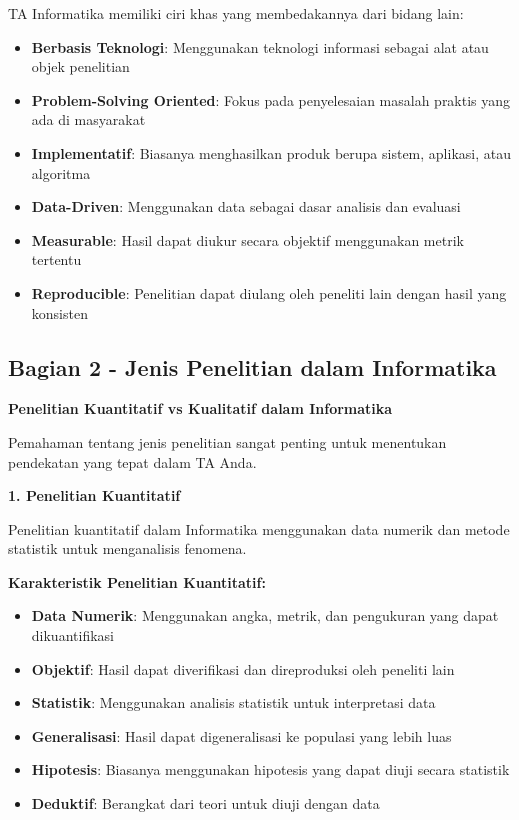 TA Informatika memiliki ciri khas yang membedakannya dari bidang lain:
\begin{itemize}
    \item \textbf{Berbasis Teknologi}: Menggunakan teknologi informasi sebagai alat atau objek penelitian
    \item \textbf{Problem-Solving Oriented}: Fokus pada penyelesaian masalah praktis yang ada di masyarakat
    \item \textbf{Implementatif}: Biasanya menghasilkan produk berupa sistem, aplikasi, atau algoritma
    \item \textbf{Data-Driven}: Menggunakan data sebagai dasar analisis dan evaluasi
    \item \textbf{Measurable}: Hasil dapat diukur secara objektif menggunakan metrik tertentu
    \item \textbf{Reproducible}: Penelitian dapat diulang oleh peneliti lain dengan hasil yang konsisten
\end{itemize}

\subsection*{Bagian 2 - Jenis Penelitian dalam Informatika}

\textbf{Penelitian Kuantitatif vs Kualitatif dalam Informatika}

Pemahaman tentang jenis penelitian sangat penting untuk menentukan pendekatan yang tepat dalam TA Anda.

\textbf{1. Penelitian Kuantitatif}

Penelitian kuantitatif dalam Informatika menggunakan data numerik dan metode statistik untuk menganalisis fenomena.

\textbf{Karakteristik Penelitian Kuantitatif:}
\begin{itemize}
    \item \textbf{Data Numerik}: Menggunakan angka, metrik, dan pengukuran yang dapat dikuantifikasi
    \item \textbf{Objektif}: Hasil dapat diverifikasi dan direproduksi oleh peneliti lain
    \item \textbf{Statistik}: Menggunakan analisis statistik untuk interpretasi data
    \item \textbf{Generalisasi}: Hasil dapat digeneralisasi ke populasi yang lebih luas
    \item \textbf{Hipotesis}: Biasanya menggunakan hipotesis yang dapat diuji secara statistik
    \item \textbf{Deduktif}: Berangkat dari teori untuk diuji dengan data
\end{itemize}

